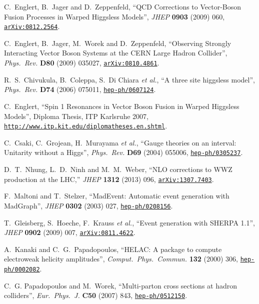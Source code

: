 \documentclass[english,12pt]{article}
\begin{document}
\begin{thebibliography}{10}
  C.~Englert, B.~Jager and D.~Zeppenfeld,
  ``QCD Corrections to Vector-Boson Fusion Processes in Warped Higgsless Models'',
  {\em JHEP} {\bf 0903 } (2009) 060,
 \href{http://arxiv.org/abs/0812.2564} {{\tt arXiv:0812.2564}}.

  C.~Englert, B.~Jager, M.~Worek and D.~Zeppenfeld,
  ``{Observing Strongly Interacting Vector Boson Systems at the CERN Large
  Hadron Collider}'',
  {\em Phys.\ Rev.} {\bf D80} (2009) 035027,
  \href{http://arxiv.org/abs/0810.4861}{{\tt arXiv:0810.4861}}.
  
  R.~S.~Chivukula, B.~Coleppa, S.~Di Chiara {\it et al.},
  ``{A three site higgsless model}'',
  {\em Phys.\ Rev.} {\bf D74} (2006) 075011,
\href{http://www.arXiv.org/abs/hep-ph/0607124}{{\tt hep-ph/0607124}}.
  
C.~Englert, ``Spin 1 Resonances in Vector Boson Fusion in Warped Higgsless
  Models'', {Diploma Thesis, ITP Karlsruhe 2007}, {\href{http://www.itp.kit.edu/diplomatheses.en.shtml}{\tt http://www.itp.kit.edu/diplomatheses.en.shtml}}.

C.~Csaki, C.~Grojean, H.~Murayama {\it et al.}, ``{Gauge theories
  on an interval: Unitarity without a Higgs}'', {\em Phys.\ Rev.} {\bf D69}
  (2004) 055006,
\href{http://www.arXiv.org/abs/hep-ph/0305237}{{\tt hep-ph/0305237}}.

  D.~T.~Nhung, L.~D.~Ninh and M.~M.~Weber,
  ``NLO corrections to WWZ production at the LHC,''
  {\em JHEP } {\bf 1312} (2013) 096,
\href{http://www.arXiv.org/abs/1307.7403}{{\tt arXiv:1307.7403}}.

F.~Maltoni and T.~Stelzer, ``{MadEvent: Automatic event generation with
  MadGraph}'', {\em JHEP} {\bf 0302} (2003) 027,
\href{http://www.arXiv.org/abs/hep-ph/0208156}{{\tt hep-ph/0208156}}.

  T.~Gleisberg, S.~Hoeche, F.~Krauss {\it et al.},
  ``{Event generation with SHERPA 1.1}'',
  {\em JHEP} {\bf 0902} (2009)  007,
\href{http://www.arXiv.org/abs/0811.4622}{{\tt arXiv:0811.4622}}.

A.~Kanaki and C.~G.~Papadopoulos, 
``{HELAC: A package to compute electroweak helicity amplitudes}'',
{\em Comput.\ Phys.\ Commun.} {\bf 132} (2000) 306,
\href{http://www.arXiv.org/abs/hep-ph/0002082}{{\tt hep-ph/0002082}}.

C.~G. Papadopoulos and M.~Worek, ``{Multi-parton cross sections at hadron
  colliders}'', {\em Eur.\ Phys.\ J.} {\bf C50} (2007) 843,
\href{http://www.arXiv.org/abs/hep-ph/0512150}{{\tt hep-ph/0512150}}.


\end{thebibliography}
\end{document}
